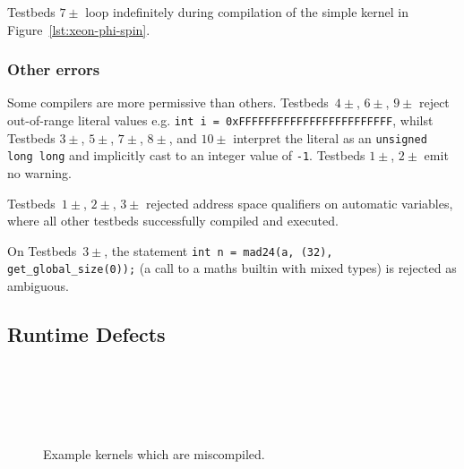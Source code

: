 Testbeds $7\pm$ loop indefinitely during compilation of the simple kernel in
Figure~\ref{lst:xeon-phi-spin}.

\subsubsection{Other errors}

Some compilers are more permissive than others. Testbeds~$4\pm$, $6\pm$, $9\pm$
reject out-of-range literal values e.g. \texttt{int i =
0xFFFFFFFFFFFFFFFFFFFFFFFF}, whilst Testbeds $3\pm$, $5\pm$, $7\pm$, $8\pm$, and
$10\pm$ interpret the literal as an \texttt{unsigned long long} and implicitly
cast to an integer value of \texttt{-1}. Testbeds $1\pm$, $2\pm$ emit no
warning.

Testbeds~$1\pm$, $2\pm$, $3\pm$ rejected address space qualifiers on automatic
variables, where all other testbeds successfully compiled and executed.

On Testbeds~$3\pm$, the statement \texttt{int n = mad24(a, (32),
get\_global\_size(0));} (a call to a maths builtin with mixed types) is rejected
as ambiguous.

\subsection{Runtime Defects}%
\label{subsec:runtime-defects}

\begin{figure}
  \centering %
  \\%
  \\%
  \\%
  \\%
  \caption[Example kernels which are miscompiled]{Example kernels which are miscompiled.}%
\end{figure}

